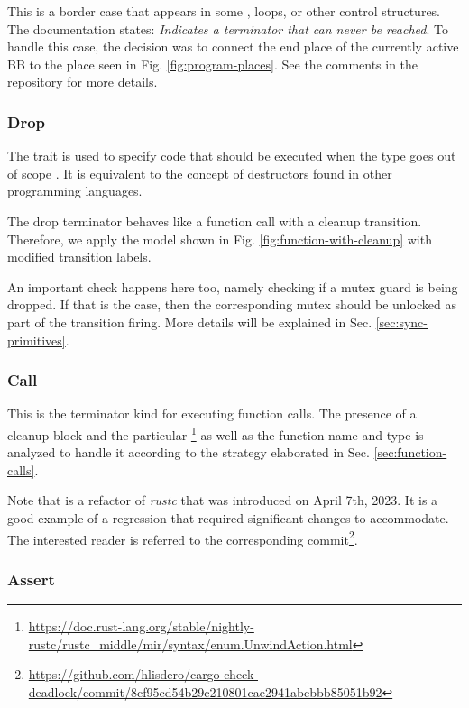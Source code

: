 This is a border case that appears
in some ,  loops, or other control structures.
The documentation states: \emph{Indicates a terminator that can never be reached}.
To handle this case, the decision was to connect
the end place of the currently active \acrshort{BB}
to the  place seen in Fig. \ref{fig:program-places}.
See the comments in the repository for more details.

\subsubsection{Drop}

The  trait is used to specify code that should be executed
when the type goes out of scope \cite[Chap. 15.3]{rust-book}.
It is equivalent to the concept of destructors found in other programming languages.

The drop terminator behaves like a function call with a cleanup transition.
Therefore, we apply the model shown in Fig. \ref{fig:function-with-cleanup}
with modified transition labels.

An important check happens here too, namely checking if a mutex guard is being dropped.
If that is the case, then the corresponding mutex should be unlocked
as part of the transition firing.
More details will be explained in Sec. \ref{sec:sync-primitives}.

\subsubsection{Call}

This is the terminator kind for executing function calls.
The presence of a cleanup block and the particular
\footnote{\url{https://doc.rust-lang.org/stable/nightly-rustc/rustc_middle/mir/syntax/enum.UnwindAction.html}}
as well as the function name and type is analyzed to handle it
according to the strategy elaborated in Sec. \ref{sec:function-calls}.

Note that  is a refactor of \emph{rustc}
that was introduced on April 7th, 2023.
It is a good example of a regression that required significant changes to accommodate.
The interested reader is referred to the corresponding
commit\footnote{\url{https://github.com/hlisdero/cargo-check-deadlock/commit/8cf95cd54b29c210801cae2941abcbbb85051b92}}.

\subsubsection{Assert}

